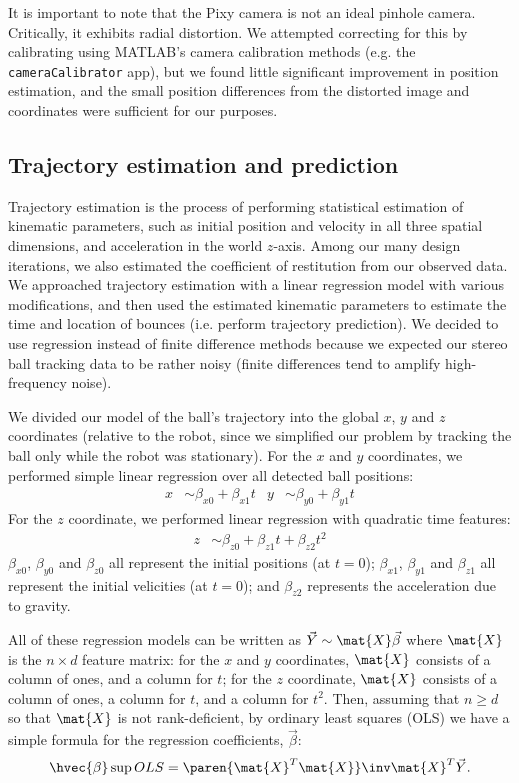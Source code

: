 \documentclass[letterpaper, 11pt]{article}
\renewcommand{\v}[1]{\vec{#1}}
\begin{document}
It is important to note that the Pixy camera is not an ideal pinhole camera. Critically, it exhibits radial distortion. We attempted correcting for this by calibrating using MATLAB's camera calibration methods (e.g. the \verb|cameraCalibrator| app), but we found little significant improvement in position estimation, and the small position differences from the distorted image and coordinates were sufficient for our purposes.

\subsection{Trajectory estimation and prediction}
Trajectory estimation is the process of performing statistical estimation of kinematic parameters, such as initial position and velocity in all three spatial dimensions, and acceleration in the world $z$-axis. Among our many design iterations, we also estimated the coefficient of restitution from our observed data. We approached trajectory estimation with a linear regression model with various modifications, and then used the estimated kinematic parameters to estimate the time and location of bounces (i.e. perform trajectory prediction). We decided to use regression instead of finite difference methods because we expected our stereo ball tracking data to be rather noisy (finite differences tend to amplify high-frequency noise).

We divided our model of the ball's trajectory into the global $x$, $y$ and $z$ coordinates (relative to the robot, since we simplified our problem by tracking the ball only while the robot was stationary). For the $x$ and $y$ coordinates, we performed simple linear regression over all detected ball positions:
\begin{align*}
    x &\sim \beta_{x0} + \beta_{x1}t & y &\sim \beta_{y0} + \beta_{y1}t
\end{align*}
For the $z$ coordinate, we performed linear regression with quadratic time features:
\begin{align*}
    z &\sim \beta_{z0} + \beta_{z1}t + \beta_{z2}t^2
\end{align*}
$\beta_{x0}$, $\beta_{y0}$ and $\beta_{z0}$ all represent the initial positions (at $t=0$); $\beta_{x1}$, $\beta_{y1}$ and $\beta_{z1}$ all represent the initial velicities (at $t=0$); and $\beta_{z2}$ represents the acceleration due to gravity.

All of these regression models can be written as $\v{Y} \sim \mat{X} \v{\beta}$ where $\mat{X}$ is the $n\times d$ feature matrix: for the $x$ and $y$ coordinates, $\mat{X}$ consists of a column of ones, and a column for $t$; for the $z$ coordinate, $\mat{X}$ consists of a column of ones, a column for $t$, and a column for $t^2$. Then, assuming that $n\ge d$ so that $\mat{X}$ is not rank-deficient, by ordinary least squares (OLS) we have a simple formula for the regression coefficients, $\v{\beta}$:
\[ \hvec{\beta}\sup{OLS} = \paren{ \mat{X}^T\mat{X} }\inv \mat{X}^T \v{Y}. \]
\end{document}
